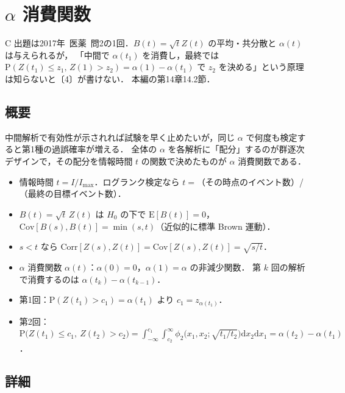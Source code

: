 \documentclass[a4paper,11pt,openany]{ltjsbook}
\newcommand{\kakomon}[2]{\mbox{#1年 医薬 問#2}}
\newcommand{\E}{\mathrm{E}}
\newcommand{\Cov}{\mathrm{Cov}}
\newcommand{\Corr}{\mathrm{Corr}}
\newcommand{\Prob}{\mathrm{P}}
\newcommand{\dd}{\mathrm{d}}
\begin{document}
\chapter{\texorpdfstring{$\alpha$}{α} 消費関数}\label{ch:m09}

\begin{priobox}{C}
出題は\kakomon{2017}{2}の1回．$B(t)=\sqrt tZ(t)$ の平均・共分散と $\alpha(t)$ は与えられるが，
「中間で $\alpha(t_1)$ を消費し，最終では $\Prob(Z(t_1)\le z_1,\,Z(1)>z_2)=\alpha(1)-\alpha(t_1)$ で $z_2$ を決める」という原理は知らないと〔4〕が書けない．
本編の第14章14.2節．
\end{priobox}

\section{概要}\label{sec:m09-gaiyo}
中間解析で有効性が示されれば試験を早く止めたいが，同じ $\alpha$ で何度も検定すると第1種の過誤確率が増える．
全体の $\alpha$ を各解析に「配分」するのが群逐次デザインで，その配分を情報時間 $t$ の関数で決めたものが $\alpha$ 消費関数である．
\begin{pointbox}[覚える式]
\begin{itemize}
\item 情報時間 $t=I/I_{\max}$．ログランク検定なら $t=$（その時点のイベント数）/（最終の目標イベント数）．
\item $B(t)=\sqrt t\,Z(t)$ は $H_0$ の下で $\E[B(t)]=0$，$\Cov[B(s),B(t)]=\min(s,t)$（近似的に標準 Brown 運動）．
\item $s<t$ なら $\Corr[Z(s),Z(t)]=\Cov[Z(s),Z(t)]=\sqrt{s/t}$．
\item $\alpha$ 消費関数 $\alpha(t)$：$\alpha(0)=0$，$\alpha(1)=\alpha$ の非減少関数．
      第 $k$ 回の解析で消費するのは $\alpha(t_k)-\alpha(t_{k-1})$．
\item 第1回：$\Prob(Z(t_1)>c_1)=\alpha(t_1)$ より $c_1=z_{\alpha(t_1)}$．
\item 第2回：$\Prob\bigl(Z(t_1)\le c_1,\ Z(t_2)>c_2\bigr)=\displaystyle\int_{-\infty}^{c_1}\int_{c_2}^{\infty}\phi_2\bigl(x_1,x_2;\sqrt{t_1/t_2}\bigr)\dd x_2\dd x_1=\alpha(t_2)-\alpha(t_1)$．
\end{itemize}
\end{pointbox}

\section{詳細}\label{sec:m09-shosai}
\end{document}
